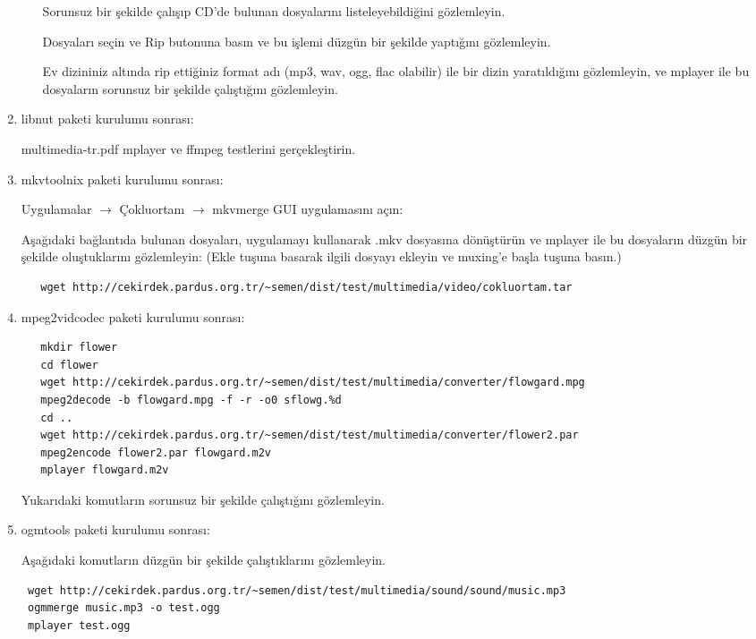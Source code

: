 \documentclass[a4paper,10pt]{article}
\begin{document}
\begin{enumerate}
\begin{itemize}
Sorunsuz bir şekilde çalışıp CD'de bulunan dosyalarını listeleyebildiğini gözlemleyin.

Dosyaları seçin ve Rip butonuna basın ve bu işlemi düzgün bir şekilde yaptığını gözlemleyin.

Ev dizininiz altında rip ettiğiniz format adı (mp3, wav, ogg, flac olabilir) ile bir dizin yaratıldığını gözlemleyin, ve mplayer ile bu dosyaların sorunsuz bir şekilde çalıştığını gözlemleyin.
\end{itemize}

\item libnut paketi kurulumu sonrası:

multimedia-tr.pdf mplayer ve ffmpeg testlerini gerçekleştirin.

\item mkvtoolnix paketi kurulumu sonrası:

Uygulamalar $\rightarrow$ Çokluortam $\rightarrow$ mkvmerge GUI uygulamasını açın:

Aşağıdaki bağlantıda bulunan dosyaları, uygulamayı kullanarak .mkv dosyasına dönüştürün ve mplayer ile bu dosyaların düzgün bir şekilde oluştuklarını gözlemleyin: (Ekle tuşuna basarak ilgili dosyayı ekleyin ve muxing'e başla tuşuna basın.)
\begin{verbatim}
   wget http://cekirdek.pardus.org.tr/~semen/dist/test/multimedia/video/cokluortam.tar
 \end{verbatim}

\item mpeg2vidcodec paketi kurulumu sonrası:
\begin{verbatim}
   mkdir flower
   cd flower
   wget http://cekirdek.pardus.org.tr/~semen/dist/test/multimedia/converter/flowgard.mpg
   mpeg2decode -b flowgard.mpg -f -r -o0 sflowg.%d
   cd ..
   wget http://cekirdek.pardus.org.tr/~semen/dist/test/multimedia/converter/flower2.par
   mpeg2encode flower2.par flowgard.m2v
   mplayer flowgard.m2v
\end{verbatim}

Yukarıdaki komutların sorunsuz bir şekilde çalıştığını gözlemleyin.
\item ogmtools paketi kurulumu sonrası:

Aşağıdaki komutların düzgün bir şekilde çalıştıklarını gözlemleyin.
\begin{verbatim}
 wget http://cekirdek.pardus.org.tr/~semen/dist/test/multimedia/sound/sound/music.mp3 
 ogmmerge music.mp3 -o test.ogg
 mplayer test.ogg
\end{verbatim}


\end{enumerate}
\end{document}

